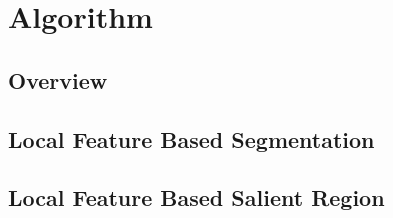 \section{Algorithm}

\subsection{Overview}

\subsection{Local Feature Based Segmentation}

\subsection{Local Feature Based Salient Region}